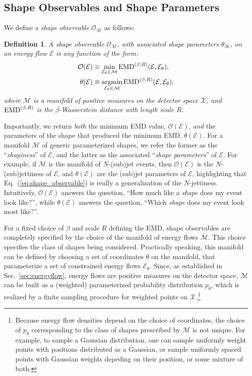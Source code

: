 \documentclass[letterpaper,11pt]{article}
\newcommand{\E}{\mathcal{E}}
\newcommand{\M}{\mathcal{M}}
\DeclareMathOperator*{\argmin}{argmin}
\DeclareRobustCommand{\Sec}[1]{Sec.~\ref{sec:#1}}
\DeclareRobustCommand{\Eq}[1]{Eq.~(\ref{eq:#1})}
\newtheorem{definition}{Definition}
\begin{document}
\subsection{Shape Observables and Shape Parameters}\label{sec:observables}



We define a \emph{shape observable} $\mathcal{O}_\M$ as follows:

\begin{definition}
A shape observable $\mathcal{O}_\M$, with associated shape parameters $\theta_\M$, on an energy flow $\E$ is any function of the form:
%
\begin{align}
    \mathcal{O}(\E) &\equiv \min_{\E_\theta \in \M} {\rm EMD}^{(\beta, R)}(\E, \E_\theta), \label{eq:shape_observable}\\
    \theta(\E) &\equiv \argmin_{\E_\theta \in \M} {\rm EMD}^{(\beta, R)}(\E, \E_\theta), \label{eq:shape_parameter}
\end{align}
%
where $\M$ is a manifold of positive measures on the detector space $\mathcal{X}$, and ${\rm EMD}^{(\beta, R)}$ is the $\beta$-Wasserstein distance with length scale $R$.
%
\end{definition}


Importantly, we return \emph{both} the minimum EMD value, $\mathcal{O}(\E)$, \emph{and} the parameters of the shape that produced the minimum EMD, $\theta(\E)$. For a manifold $\M$ of generic parameterized shapes, we refer the former as the ``\emph{shapiness}'' of $\E$, and the latter as the associated ``\emph{shape parameters}'' of $\E$. For example, if $\M$ is the manifold of $N$-(sub)jet events, then $\mathcal{O}(\E)$ is the $N$-(sub)jettiness of $\E$, and $\theta(\E)$ are the (sub)jet parameters of $\E$, highlighting that \Eq{shape_observable} is really a generalization of the $N$-jettiness. Intuitively, $\mathcal{O}(\E)$ answers the question, ``How much like a \textit{shape} does my event look like?'', while $\theta(\E)$ answers the question, ``Which \textit{shape} does my event look most like?''. 


For a fixed choice of $\beta$ and scale $R$ defining the EMD, shape observables are completely specified by the choice of the manifold of energy flows $\M$. This choice specifies the class of shapes being considered. Practically speaking, this manifold can be defined by choosing a set of coordinates $\theta$ on the manifold, that parameterize a set of constrained energy flows $\E_\theta$. Since, as established in \Sec{energyflow}, energy flows are positive measures on the detector space, $\M$ can be built as a (weighted) parameterized probability distribution $p_\theta$, which is realized by a finite sampling procedure for weighted points on $\mathcal{X}$.\footnote{Because energy flow densities depend on the choice of coordinates, the choice of $p_\theta$ corresponding to the class of shapes prescribed by $\M$ is not unique. For example, to sample a Gaussian distribution, one can sample uniformly weight points with positions distributed as a Gaussian, or sample uniformly spaced points with Gaussian weights depeding on their position, or some mixture of both.}
\end{document}

